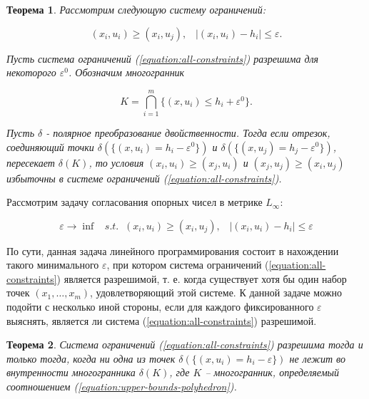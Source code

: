 \documentclass[a4paper, 10pt]{article}
\theoremstyle{definition}
\theoremstyle{plain}
\newtheorem{SmartTheorem}{Теорема}
\theoremstyle{plain}
\begin{document}
\begin{SmartTheorem}\label{theorem:exhaustive-conditions}
Рассмотрим следующую систему ограничений:

\begin{equation}
\label{equation:all-constraints}
 (x_{i}, u_{i}) \geq (x_{i}, u_{j}), \;\;\;
 |(x_{i}, u_{i}) - h_{i}| \leq \varepsilon.
\end{equation}

Пусть система ограничений (\ref{equation:all-constraints}) разрешима
для некоторого $\varepsilon^{0}$. Обозначим многогранник

\begin{equation}
\label{equation:upper-bounds-polyhedron}
 K = \bigcap \limits_{i = 1}^{m}\{(x, u_{i}) \leq h_{i} + \varepsilon^{0}\}.
\end{equation}

Пусть $\delta$ - полярное преобразование двойственности.
Тогда если отрезок, соединяющий точки
$\delta(\{(x, u_{i}) = h_{i} - \varepsilon^{0}\})$ и
$\delta(\{(x, u_{j}) = h_{j} - \varepsilon^{0}\})$, пересекает
$\delta(K)$, то условия $(x_{i}, u_{i}) \geq (x_{j}, u_{i})$ и
$(x_{j}, u_{j}) \geq (x_{i}, u_{j})$ избыточны в системе ограничений
(\ref{equation:all-constraints}).
\end{SmartTheorem}

Рассмотрим задачу согласования опорных чисел в метрике $L_{\infty}$:

\begin{equation}
\label{equation:infinity-problem}
 \varepsilon \to \inf \;\;\;
 s. t. \;\; (x_{i}, u_{i}) \geq (x_{i}, u_{j}), \;\;\;
 |(x_{i}, u_{i}) - h_{i}| \leq \varepsilon
\end{equation}

По сути, данная задача линейного программирования состоит в нахождении такого
минимального $\varepsilon$, при котором система ограничений
(\ref{equation:all-constraints}) является разрешимой, т. е. когда существует
хотя бы один набор точек $(x_{1}, \ldots, x_{m})$, удовлетворяющий этой системе.
К данной задаче можно подойти с несколько иной стороны, если для каждого
фиксированного $\varepsilon$ выяснять, является ли система
(\ref{equation:all-constraints}) разрешимой.

\begin{SmartTheorem}
 Система ограничений (\ref{equation:all-constraints}) разрешима тогда и только
 тогда, когда ни одна из точек
 $\delta(\{(x, u_{i}) = h_{i} - \varepsilon\})$ не лежит во внутренности
 многогранника $\delta(K)$, где $K$ -- многогранник, определяемый соотношением
 (\ref{equation:upper-bounds-polyhedron}).
\end{SmartTheorem}
\end{document}

